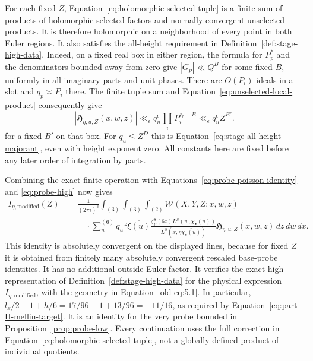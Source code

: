 \documentclass[11pt,a4paper]{article}
\numberwithin{equation}{section}
\numberwithin{figure}{section}
\theoremstyle{definition}
\theoremstyle{remark}
\begin{document}
For each fixed $Z$, Equation~\eqref{eq:holomorphic-selected-tuple} is a
finite sum of products of holomorphic selected factors and normally
convergent unselected products.  It is therefore holomorphic on a
neighborhood of every point in both Euler regions.  It also satisfies
the all-height requirement in Definition~\ref{def:stage-high-data}.
Indeed, on a fixed real box in either region, the formula for $P_p^*$ and
the denominators bounded away from zero give $|G_p|\ll Q^B$ for some
fixed $B$, uniformly in all imaginary parts and unit phases.  There are
$O(P_i)$ ideals in a slot and $q_p\asymp P_i$ there.  The finite tuple
sum and Equation~\eqref{eq:unselected-local-product} consequently give
\begin{equation}\label{eq:compensated-all-height-majorant}
 |\mathfrak H_{\eta,u,Z}(x,w,z)|
 \ll_\epsilon q_u^\epsilon\prod_iP_i^{z_r+B}
 \ll_\epsilon q_u^\epsilon Z^{B'}.
\end{equation}
for a fixed $B'$ on that box.  For $q_u\le Z^D$ this is
Equation~\eqref{eq:stage-all-height-majorant}, even with height exponent
zero.  All constants here are fixed before any later order of integration
by parts.

Combining the exact finite operation with
Equations~\eqref{eq:probe-poisson-identity} and \eqref{eq:probe-high}
now gives
\begin{equation}\label{eq:compensated-poisson-identity}
\begin{split}
 I_{\eta,\mathrm{modified}}(Z)
 ={}&\frac1{(2\pi i)^3}\int_{(3)}\int_{(3)}\int_{(2)}
       \mathcal W(X,Y,Z;x,w,z)\\
 &\quad\cdot\sum_u^{(6)}q_u^{-z}\overline{\xi(u)}
       \frac{\zeta_F^S(6z)L^S(w,\chi_\bullet(u))}
       {L^S(x,\eta\overline{\chi_\bullet(u)})}
       \mathfrak H_{\eta,u,Z}(x,w,z)\,dz\,dw\,dx.
\end{split}
\end{equation}
This identity is absolutely convergent on the displayed lines, because for
fixed $Z$ it is obtained from finitely many absolutely convergent rescaled
base-probe identities.  It has no additional outside Euler factor.  It
verifies the exact high representation of Definition~\ref{def:stage-high-data}
for the physical expression $I_{\eta,\mathrm{modified}}$, with the geometry
in Equation~\eqref{old-eq:5.1}.  In particular,
$l_x/2-1+h/6=17/96-1+13/96=-11/16$, as required by
Equation~\eqref{eq:part-II-mellin-target}.  It is an identity for the very
probe bounded in Proposition~\ref{prop:probe-low}.  Every continuation
uses the full correction in Equation~\eqref{eq:holomorphic-selected-tuple},
not a globally defined product of individual quotients.
\end{document}
